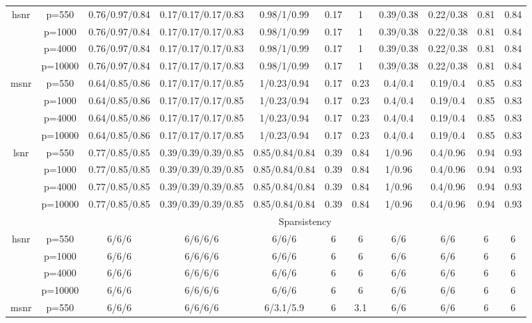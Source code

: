 \begin{table}[ht]
{\begin{tabular}{|c|c|ccccccccc|}
\midrule\multirow{4}[2]{*}{hsnr} & p=550 & 0.76/0.97/0.84 & 0.17/0.17/0.17/0.83 & 0.98/1/0.99 & 0.17 & 1 & 0.39/0.38 & 0.22/0.38 & 0.81 & 0.84 \\ 
   & p=1000 & 0.76/0.97/0.84 & 0.17/0.17/0.17/0.83 & 0.98/1/0.99 & 0.17 & 1 & 0.39/0.38 & 0.22/0.38 & 0.81 & 0.84 \\ 
   & p=4000 & 0.76/0.97/0.84 & 0.17/0.17/0.17/0.83 & 0.98/1/0.99 & 0.17 & 1 & 0.39/0.38 & 0.22/0.38 & 0.81 & 0.84 \\ 
   & p=10000 & 0.76/0.97/0.84 & 0.17/0.17/0.17/0.83 & 0.98/1/0.99 & 0.17 & 1 & 0.39/0.38 & 0.22/0.38 & 0.81 & 0.84 \\ 
  \midrule\multirow{4}[2]{*}{msnr} & p=550 & 0.64/0.85/0.86 & 0.17/0.17/0.17/0.85 & 1/0.23/0.94 & 0.17 & 0.23 & 0.4/0.4 & 0.19/0.4 & 0.85 & 0.83 \\ 
   & p=1000 & 0.64/0.85/0.86 & 0.17/0.17/0.17/0.85 & 1/0.23/0.94 & 0.17 & 0.23 & 0.4/0.4 & 0.19/0.4 & 0.85 & 0.83 \\ 
   & p=4000 & 0.64/0.85/0.86 & 0.17/0.17/0.17/0.85 & 1/0.23/0.94 & 0.17 & 0.23 & 0.4/0.4 & 0.19/0.4 & 0.85 & 0.83 \\ 
   & p=10000 & 0.64/0.85/0.86 & 0.17/0.17/0.17/0.85 & 1/0.23/0.94 & 0.17 & 0.23 & 0.4/0.4 & 0.19/0.4 & 0.85 & 0.83 \\ 
  \midrule\multirow{4}[2]{*}{lsnr} & p=550 & 0.77/0.85/0.85 & 0.39/0.39/0.39/0.85 & 0.85/0.84/0.84 & 0.39 & 0.84 & 1/0.96 & 0.4/0.96 & 0.94 & 0.93 \\ 
   & p=1000 & 0.77/0.85/0.85 & 0.39/0.39/0.39/0.85 & 0.85/0.84/0.84 & 0.39 & 0.84 & 1/0.96 & 0.4/0.96 & 0.94 & 0.93 \\ 
   & p=4000 & 0.77/0.85/0.85 & 0.39/0.39/0.39/0.85 & 0.85/0.84/0.84 & 0.39 & 0.84 & 1/0.96 & 0.4/0.96 & 0.94 & 0.93 \\ 
   & p=10000 & 0.77/0.85/0.85 & 0.39/0.39/0.39/0.85 & 0.85/0.84/0.84 & 0.39 & 0.84 & 1/0.96 & 0.4/0.96 & 0.94 & 0.93 \\ 
   \midrule 
 \multicolumn{1}{|c}{} &       & \multicolumn{9}{c|}{Sparsistency} \\
\midrule\multirow{4}[2]{*}{hsnr} & p=550 & 6/6/6 & 6/6/6/6 & 6/6/6 & 6 & 6 & 6/6 & 6/6 & 6 & 6 \\ 
   & p=1000 & 6/6/6 & 6/6/6/6 & 6/6/6 & 6 & 6 & 6/6 & 6/6 & 6 & 6 \\ 
   & p=4000 & 6/6/6 & 6/6/6/6 & 6/6/6 & 6 & 6 & 6/6 & 6/6 & 6 & 6 \\ 
   & p=10000 & 6/6/6 & 6/6/6/6 & 6/6/6 & 6 & 6 & 6/6 & 6/6 & 6 & 6 \\ 
  \midrule\multirow{4}[2]{*}{msnr} & p=550 & 6/6/6 & 6/6/6/6 & 6/3.1/5.9 & 6 & 3.1 & 6/6 & 6/6 & 6 & 6 \\ 

\end{tabular}}
\end{table}
